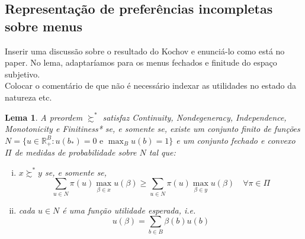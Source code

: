 \documentclass[11pt, a4paper]{article}
\theoremstyle{nonumberplain}
\theoremstyle{plain}
\theoremstyle{plain}
\theoremstyle{plain}
\newtheorem{lemma}{Lema}
\begin{document}
\subsection{Representação de preferências incompletas sobre menus}
{\color{cadmiumgreen}Inserir uma discussão sobre o resultado do Kochov e enunciá-lo como está no paper. No lema, adaptaríamos para os menus fechados e finitude do espaço subjetivo.\\
Colocar o comentário de que não é necessário indexar as utilidades no estado da natureza etc.}

\begin{lemma}\label{nossoKochov} A preordem $\succsim^*$ satisfaz \emph{Continuity}, \emph{Nondegeneracy}, \emph{Independence}, \emph{Monotonicity} e \emph{Finitiness*} se, e somente se, existe um conjunto finito de funções $N=\{u \in \mathbb{R}^B_+:u(b_*)=0\text { e }\max_{B}u(b)=1\}$ e um conjunto fechado e convexo $\Pi$ de medidas de probabilidade sobre $N$ tal que:
\begin{enumerate}[(i)]
\item $x\succsim^* y$ se, e somente se, $$ \sum_{u\in N} \pi(u)\max_{\beta\in x}u(\beta) \geq \sum_{u\in N} \pi(u)\max_{\beta\in y}u(\beta)\quad \forall\pi\in\Pi$$  
\item cada $u \in N$ é uma função utilidade esperada, i.e. $$u(\beta)=\sum_{b\in B} \beta(b)u(b)$$ 
\end{enumerate}     
\end{lemma}
\end{document}
